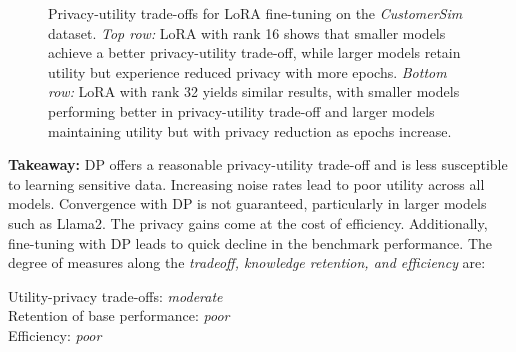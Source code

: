 \begin{figure*}[t]
    \caption{
        Privacy-utility trade-offs for LoRA fine-tuning on the \emph{CustomerSim} dataset. \emph{Top row:} LoRA with rank 16 shows that smaller models achieve a better privacy-utility trade-off, while larger models retain utility but experience reduced privacy with more epochs. \emph{Bottom row:} LoRA with rank 32 yields similar results, with smaller models performing better in privacy-utility trade-off and larger models maintaining utility but with privacy reduction as epochs increase.
    }
    \label{fig:combined_lora}
\end{figure*}

\noindent
\textbf{Takeaway:} DP offers a reasonable privacy-utility trade-off and is less susceptible to learning sensitive data. Increasing noise rates lead to poor utility across all models.
Convergence with DP
is not guaranteed, particularly in larger models such as Llama2.
The privacy gains come at the cost of efficiency.
Additionally, fine-tuning with DP leads to quick decline in the benchmark performance. The degree of measures along the \textit{tradeoff, knowledge retention, and efficiency} are: 

\indent Utility-privacy trade-offs: \textit{moderate} \\
\indent Retention of base performance: \textit{poor} \\
\indent Efficiency: \textit{poor}


